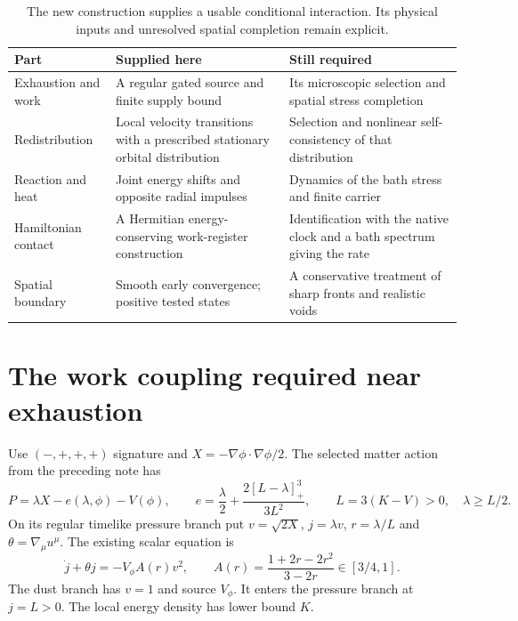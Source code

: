 \documentclass[11pt]{article}
\begin{document}
\begin{table}[ht]
\small
\begin{tabularx}{\textwidth}{@{}p{}XX@{}}
\toprule
Part & Supplied here & Still required \\
\midrule
Exhaustion and work & A regular gated source and finite supply bound &
Its microscopic selection and spatial stress completion \\
Redistribution & Local velocity transitions with a prescribed stationary
orbital distribution & Selection and nonlinear self-consistency of that distribution \\
Reaction and heat & Joint energy shifts and opposite radial impulses &
Dynamics of the bath stress and finite carrier \\
Hamiltonian contact & A Hermitian energy-conserving work-register construction &
Identification with the native clock and a bath spectrum giving the rate \\
Spatial boundary & Smooth early convergence; positive tested states &
A conservative treatment of sharp fronts and realistic voids \\
\bottomrule
\end{tabularx}
\caption{The new construction supplies a usable conditional interaction.
Its physical inputs and unresolved spatial completion remain explicit.}
\end{table}

\section{The work coupling required near exhaustion}
Use $(-,+,+,+)$ signature and $X=-\nabla\phi\cdot\nabla\phi/2$. The selected
matter action from the preceding note has
\begin{equation}
 P=\lambda X-e(\lambda,\phi)-V(\phi),\qquad
 e=\frac{\lambda}{2}+\frac{2[L-\lambda]_+^3}{3L^2},\qquad
 L=3(K-V)>0,\quad\lambda\ge L/2.
\end{equation}
On its regular timelike pressure branch put $v=\sqrt{2X}$,
$j=\lambda v$, $r=\lambda/L$ and $\theta=\nabla_\mu u^\mu$.
The existing scalar equation is
\begin{equation}
 \dot j+\theta j=-V_\phi A(r)v^2,\qquad
 A(r)=\frac{1+2r-2r^2}{3-2r}\in[3/4,1].
\end{equation}
The dust branch has $v=1$ and source $V_\phi$. It enters the pressure branch
at $j=L>0$. The local energy density has lower bound $K$.
\end{document}
